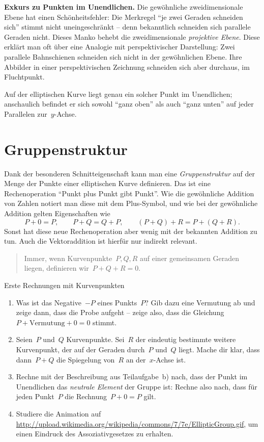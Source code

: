 \documentclass{zirkelblatt}
\newcommand{\head}[1]{\section*{\rmfamily #1}}%
\begin{document}
\textbf{Exkurs zu Punkten im Unendlichen.} Die gewöhnliche zweidimensionale
Ebene hat einen Schönheitsfehler: Die Merkregel "`je zwei Geraden schneiden
sich"' stimmt nicht uneingeschränkt -- denn bekanntlich schneiden sich
parallele Geraden nicht. Dieses Manko behebt die zweidimensionale
\emph{projektive Ebene}. Diese erklärt man oft über eine Analogie mit
perspektivischer Darstellung: Zwei parallele Bahnschienen schneiden sich nicht
in der gewöhnlichen Ebene. Ihre Abbilder in einer perspektivischen Zeichnung
schneiden sich aber durchaus, im Fluchtpunkt.

Auf der elliptischen Kurve liegt genau ein solcher Punkt im Unendlichen;
anschaulich befindet er sich sowohl "`ganz oben"' als auch "`ganz unten"' auf
jeder Parallelen zur~$y$-Achse.


\head{Gruppenstruktur}

Dank der besonderen Schnitteigenschaft kann man eine
\emph{Gruppenstruktur} auf der Menge der Punkte einer elliptischen Kurve definieren.
Das ist eine Rechenoperation "`Punkt plus Punkt gibt Punkt"'. Wie die
gewöhnliche Addition von Zahlen notiert man diese mit dem Plus-Symbol, und wie
bei der gewöhnliche Addition gelten Eigenschaften wie
\[ P + 0 = P, \qquad P + Q = Q + P, \qquad (P + Q) + R = P + (Q + R). \]
Sonst hat diese neue Rechenoperation aber wenig mit der bekannten Addition zu
tun. Auch die Vektoraddition ist hierfür nur indirekt relevant.

\begin{quote}Immer, wenn Kurvenpunkte~$P, Q, R$ auf einer gemeinsamen Geraden
liegen, definieren wir~$P + Q + R = 0$.
\end{quote}

\begin{aufgabeShaded}{Erste Rechnungen mit Kurvenpunkten}
\begin{enumerate}
\item Was ist das Negative~$-P$ eines Punkts~$P$? Gib dazu eine Vermutung ab
und zeige dann, dass die Probe aufgeht -- zeige also, dass die Gleichung~$P +
\text{Vermutung} + 0 = 0$ stimmt.
\item Seien~$P$ und~$Q$ Kurvenpunkte. Sei~$R$ der eindeutig bestimmte weitere
Kurvenpunkt, der auf der Geraden durch~$P$ und~$Q$ liegt. Mache dir klar, dass
dann~$P + Q$ die Spiegelung von~$R$ an der~$x$-Achse ist.
\item Rechne mit der Beschreibung aus Teilaufgabe~b) nach, dass der Punkt im
Unendlichen das \emph{neutrale Element} der Gruppe ist: Rechne also nach, dass
für jeden Punkt~$P$ die Rechnung~$P + 0 = P$ gilt.
\item Studiere die Animation auf
\url{http://upload.wikimedia.org/wikipedia/commons/7/7e/EllipticGroup.gif}, um
einen Eindruck des Assoziativgesetzes zu erhalten.
\end{enumerate}
\end{aufgabeShaded}
\end{document}
